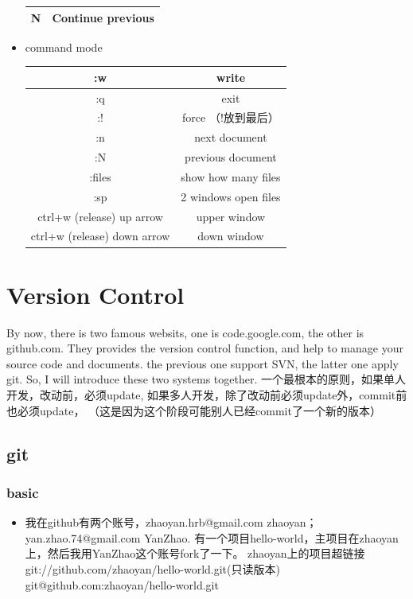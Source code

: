 \documentclass[a4paper,12pt,twoside]{book}
\begin{document}
\begin{CJK*}{UTF8}{song}
\begin{itemize}
\begin{center}
\begin{tabular}{c|c}
		N & Continue previous\\
		\hline
		\end{tabular}
	\end{center}
	\item command mode \\
	\begin{center}
		\begin{tabular}{c|c}
		\hline :w & write \\
		\hline :q & exit \\
		\hline :! & force （!放到最后）\\
		\hline :n & next document \\
		\hline :N & previous document \\
		\hline :files & show how many files \\
		\hline :sp & 2 windows open files \\
		\hline ctrl+w (release) up arrow & upper window \\
		\hline ctrl+w (release) down arrow& down window \\
		\end{tabular}
	\end{center}

	\end{itemize}




\section{Version Control}
By now,  there is two famous websits, one is code.google.com, the other is github.com. They provides the version control function, and help to manage your source code and documents. the previous one support SVN, the latter one apply git. So, I will introduce these two systems together.
一个最根本的原则，如果单人开发，改动前，必须update, 如果多人开发，除了改动前必须update外，commit前也必须update， （这是因为这个阶段可能别人已经commit了一个新的版本）
\subsection{git}
\subsubsection{basic}
\begin{itemize}
\item 我在github有两个账号，zhaoyan.hrb@gmail.com zhaoyan；yan.zhao.74@gmail.com YanZhao. 有一个项目hello-world，主项目在zhaoyan上，然后我用YanZhao这个账号fork了一下。
zhaoyan上的项目超链接
git://github.com/zhaoyan/hello-world.git(只读版本) git@github.com:zhaoyan/hello-world.git


\end{itemize}
\end{CJK*}
\end{document}
